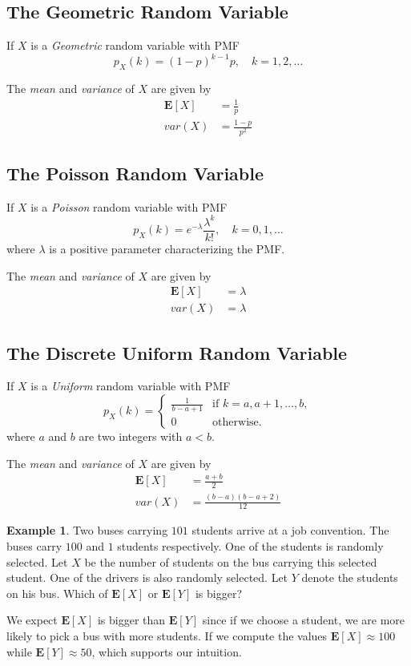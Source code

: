 \documentclass{tufte-handout}
\theoremstyle{definition} \newtheorem{definition}{Definition}
\theoremstyle{definition} \newtheorem{remark}{Remark}
\theoremstyle{definition} \newtheorem{example}{Example}
\newcommand{\pmf}[2]{p_#1 \left( #2 \right)}
\newcommand{\expt}[1]{\mathbf{E} \left[ #1 \right]}
\begin{document}
\subsection{The Geometric Random Variable}
If $X$ is a \emph{Geometric} random variable with PMF
\begin{equation*}
  \pmf{X}{k} = {(1 - p)}^{k - 1} p, \quad k = 1, 2, \ldots
\end{equation*}

The \emph{mean} and \emph{variance} of $X$ are given by
\begin{align*}
  \expt{X} & = \frac{1}{p}\\
  var(X)   & = \frac{1 - p}{p^2}
\end{align*}

\subsection{The Poisson Random Variable}
If $X$ is a \emph{Poisson} random variable with PMF
\begin{equation*}
  \pmf{X}{k} = e^{-\lambda} \frac{\lambda^k}{k!},\quad k = 0,1, \ldots
\end{equation*}
where $\lambda$ is a positive parameter characterizing the PMF.

The \emph{mean} and \emph{variance} of $X$ are given by
\begin{align*}
  \expt{X} & = \lambda \\
  var(X)   & = \lambda
\end{align*}

\subsection{The Discrete Uniform Random Variable}
If $X$ is a \emph{Uniform} random variable with PMF
\begin{equation*}
  \pmf{X}{k} =
  \begin{cases}
    \frac{1}{b - a + 1} & \text{if } k = a, a + 1, \ldots, b,\\
    0 & \text{otherwise.}
  \end{cases}
\end{equation*}
where $a$ and $b$ are two integers with $a < b$.

The \emph{mean} and \emph{variance} of $X$ are given by
\begin{align*}
  \expt{X} & = \frac{a + b}{2} \\
  var(X)   & = \frac{(b - a)(b - a + 2)}{12}
\end{align*}

\begin{example}
  Two buses carrying $101$ students arrive at a job convention. The buses
  carry $100$ and $1$ students respectively. One of the students is
  randomly selected. Let $X$ be the number of students on the bus
  carrying this selected student. One of the drivers is also randomly
  selected. Let $Y$ denote the students on his bus. Which of $\expt{X}$
  or $\expt{Y}$ is bigger?
\end{example}
We expect $\expt{X}$ is bigger than $\expt{Y}$ since if we choose a
student, we are more likely to pick a bus with more students. If we
compute the values $\expt{X} \approx 100$ while $\expt{Y} \approx 50$,
which supports our intuition.
\end{document}
